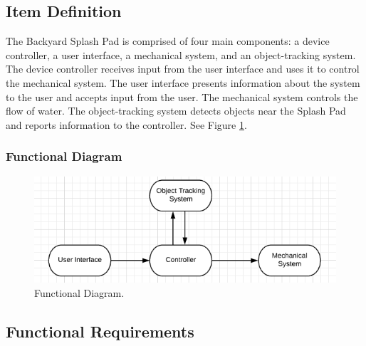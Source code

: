 %
%
%
%
\subsection{Item Definition} 
The Backyard Splash Pad is comprised of four main components: a device controller, a user interface, a mechanical system, and an object-tracking system. 
The device controller receives input from the user interface and uses it to control the mechanical system.
The user interface presents information about the system to the user and accepts input from the user.
The mechanical system controls the flow of water. 
The object-tracking system detects objects near the Splash Pad and reports information to the controller. 
See Figure \ref{fig:functional_diagram}.

\subsubsection{Functional Diagram}

\begin{figure}[h]
\begin{centering}
\includegraphics{Functional_Diagram.png}
\caption{\label{fig:functional_diagram}Functional Diagram.}
\end{centering}
\end{figure}

\subsection{Functional Requirements}

